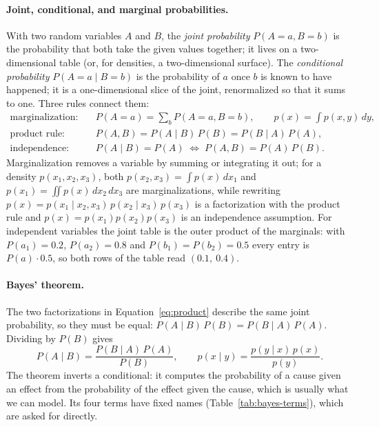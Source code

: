 \paragraph{Joint, conditional, and marginal probabilities.}
With two random variables $A$ and $B$, the \emph{joint probability}
$P(A=a,B=b)$ is the probability that both take the given values together; it
lives on a two-dimensional table (or, for densities, a two-dimensional surface).
The \emph{conditional probability} $P(A=a\mid B=b)$ is the probability of $a$
once $b$ is known to have happened; it is a one-dimensional slice of the joint,
renormalized so that it sums to one. Three rules connect them:
\begin{align}
  \text{marginalization:}&\quad P(A=a) = \sum_b P(A=a,B=b),
    \qquad p(x) = \int p(x,y)\,dy, \label{eq:marginal}\\
  \text{product rule:}&\quad P(A,B) = P(A\mid B)\,P(B) = P(B\mid A)\,P(A),
    \label{eq:product}\\
  \text{independence:}&\quad P(A\mid B) = P(A)
    \;\Longleftrightarrow\; P(A,B) = P(A)\,P(B). \label{eq:indep}
\end{align}
\noindent
Marginalization removes a variable by summing or integrating it out; for a
density $p(x_1,x_2,x_3)$, both $p(x_2,x_3) = \int p(x)\,dx_1$ and
$p(x_1) = \iint p(x)\,dx_2\,dx_3$ are marginalizations, while rewriting
$p(x) = p(x_1\mid x_2,x_3)\,p(x_2\mid x_3)\,p(x_3)$ is a factorization with the
product rule and $p(x) = p(x_1)p(x_2)p(x_3)$ is an independence assumption.
For independent variables the joint table is the outer product of the
marginals: with $P(a_1) = 0.2$, $P(a_2) = 0.8$ and $P(b_1) = P(b_2) = 0.5$ every
entry is $P(a)\cdot 0.5$, so both rows of the table read $(0.1,\ 0.4)$.

\paragraph{Bayes' theorem.}
The two factorizations in Equation~\eqref{eq:product} describe the same joint
probability, so they must be equal:
$P(A\mid B)\,P(B) = P(B\mid A)\,P(A)$. Dividing by $P(B)$ gives
\begin{equation}
  P(A\mid B) = \frac{P(B\mid A)\,P(A)}{P(B)},
  \qquad
  p(x\mid y) = \frac{p(y\mid x)\,p(x)}{p(y)} .
  \label{eq:bayes}
\end{equation}
\noindent
The theorem inverts a conditional: it computes the probability of a cause given
an effect from the probability of the effect given the cause, which is usually
what we can model. Its four terms have fixed names (Table~\ref{tab:bayes-terms}),
which are asked for directly.

